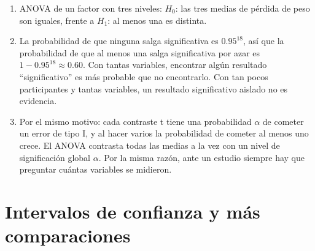 \documentclass[
  spanish,
  a4paper,
]{scrreport}
\theoremstyle{definition}
\theoremstyle{remark}
\begin{document}
\begin{tcolorbox}[enhanced jigsaw, arc=.35mm, bottomrule=.15mm, bottomtitle=1mm, breakable, colback=white, colbacktitle=quarto-callout-tip-color!10!white, colframe=quarto-callout-tip-color-frame, coltitle=black, left=2mm, leftrule=.75mm, opacityback=0, opacitybacktitle=0.6, rightrule=.15mm, title=\textcolor{quarto-callout-tip-color}{\faLightbulb}\hspace{0.5em}{Solución}, titlerule=0mm, toprule=.15mm, toptitle=1mm]

\begin{enumerate}
\def\labelenumi{\alph{enumi}.}
\item
  ANOVA de un factor con tres niveles: \(H_0\): las tres medias de
  pérdida de peso son iguales, frente a \(H_1\): al menos una es
  distinta.
\item
  La probabilidad de que ninguna salga significativa es \(0.95^{18}\),
  así que la probabilidad de que al menos una salga significativa por
  azar es \(1-0.95^{18}\approx 0.60\). Con tantas variables, encontrar
  algún resultado ``significativo'' es más probable que no encontrarlo.
  Con tan pocos participantes y tantas variables, un resultado
  significativo aislado no es evidencia.
\item
  Por el mismo motivo: cada contraste t tiene una probabilidad
  \(\alpha\) de cometer un error de tipo I, y al hacer varios la
  probabilidad de cometer al menos uno crece. El ANOVA contrasta todas
  las medias a la vez con un nivel de significación global \(\alpha\).
  Por la misma razón, ante un estudio siempre hay que preguntar cuántas
  variables se midieron.
\end{enumerate}

\end{tcolorbox}

\section{Intervalos de confianza y más
comparaciones}\label{intervalos-de-confianza-y-muxe1s-comparaciones}
\end{document}
